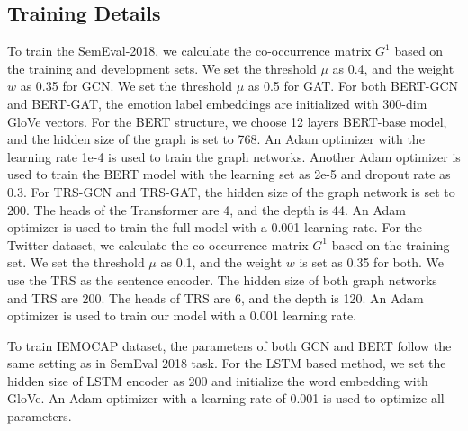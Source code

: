 \documentclass[11pt,a4paper]{article}
\begin{document}
\subsection{Training Details}
To train the SemEval-2018, we calculate the co-occurrence matrix $G^1$ based on the training and development sets. We set the threshold $\mu$ as 0.4, and the weight $w$ as 0.35 for GCN. We set the threshold $\mu$ as 0.5 for GAT. For both BERT-GCN and BERT-GAT, the emotion label embeddings are initialized with 300-dim GloVe vectors. For the BERT structure, we choose 12 layers BERT-base model, and the hidden size of the graph is set to 768. An Adam optimizer with the learning rate 1e-4 is used to train the graph networks. Another Adam optimizer is used to train the BERT model with the learning set as 2e-5 and dropout rate as 0.3. For TRS-GCN and TRS-GAT, the hidden size of the graph network is set to 200. The heads of the Transformer are 4, and the depth is 44. An Adam optimizer is used to train the full model with a 0.001 learning rate.  For the Twitter dataset, we calculate the co-occurrence matrix $G^1$ based on the training set. We set the threshold $\mu$ as 0.1, and the weight $w$ is set as 0.35 for both. We use the TRS as the sentence encoder. The hidden size of both graph networks and TRS are 200. The heads of TRS are 6, and the depth is 120. An Adam optimizer is used to train our model with a 0.001 learning rate.

To train IEMOCAP dataset, the parameters of both GCN and BERT follow the same setting as in SemEval 2018 task. For the LSTM based method, we set the hidden size of LSTM encoder as 200 and initialize the word embedding with GloVe. An Adam optimizer with a learning rate of 0.001 is used to optimize all parameters.

\begin{table}[t]
\centering
{}
\caption{Percentage of tweets that are labeled with a given emotion in the SemEval-2018 Task 1 dataset.}
\label{table:semeval_data}
\end{table}
\end{document}
